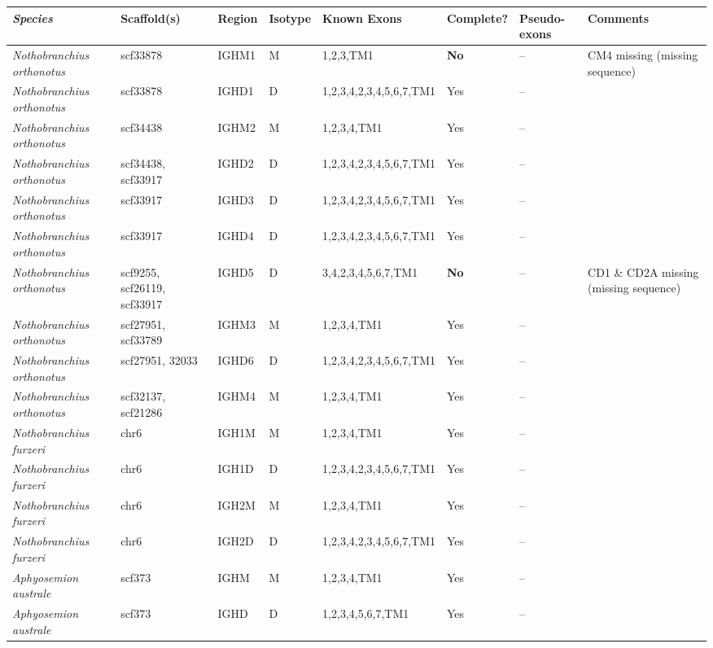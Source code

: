 \begin{tabular}{>{\itshape}lllllllp{4cm}}
  \toprule \textnormal{\textbf{Species}} & \textbf{Scaffold(s)} & \textbf{Region} & \textbf{Isotype} & \textbf{Known Exons} \tnote{1} & \textbf{Complete?} & \textbf{Pseudo-exons} & \textbf{Comments} \\ 
  \midrule Nothobranchius orthonotus & scf33878 & IGHM1 & M & 1,2,3,TM1 & \textbf{No} & -- & CM4 missing (missing sequence) \\ 
  Nothobranchius orthonotus & scf33878 & IGHD1 & D & 1,2,3,4,2,3,4,5,6,7,TM1 & Yes & -- &  \\ 
  Nothobranchius orthonotus & scf34438 & IGHM2 & M & 1,2,3,4,TM1 & Yes & -- &  \\ 
  Nothobranchius orthonotus & scf34438, scf33917 & IGHD2 & D & 1,2,3,4,2,3,4,5,6,7,TM1 & Yes & -- &  \\ 
  Nothobranchius orthonotus & scf33917 & IGHD3 & D & 1,2,3,4,2,3,4,5,6,7,TM1 & Yes & -- &  \\ 
  Nothobranchius orthonotus & scf33917 & IGHD4 & D & 1,2,3,4,2,3,4,5,6,7,TM1 & Yes & -- &  \\ 
  Nothobranchius orthonotus & scf9255, scf26119, scf33917 & IGHD5 & D & 3,4,2,3,4,5,6,7,TM1 & \textbf{No} & -- & CD1 \& CD2A missing (missing sequence) \\ 
  Nothobranchius orthonotus & scf27951, scf33789 & IGHM3 & M & 1,2,3,4,TM1 & Yes & -- &  \\ 
  Nothobranchius orthonotus & scf27951, 32033 & IGHD6 & D & 1,2,3,4,2,3,4,5,6,7,TM1 & Yes & -- &  \\ 
  Nothobranchius orthonotus & scf32137, scf21286 & IGHM4 & M & 1,2,3,4,TM1 & Yes & -- &  \\ 
  Nothobranchius furzeri & chr6 \tnote{2} & IGH1M & M & 1,2,3,4,TM1 & Yes & -- &  \\ 
  Nothobranchius furzeri & chr6 \tnote{2} & IGH1D & D & 1,2,3,4,2,3,4,5,6,7,TM1 & Yes & -- &  \\ 
  Nothobranchius furzeri & chr6 \tnote{2} & IGH2M & M & 1,2,3,4,TM1 & Yes & -- &  \\ 
  Nothobranchius furzeri & chr6 \tnote{2} & IGH2D & D & 1,2,3,4,2,3,4,5,6,7,TM1 & Yes & -- &  \\ 
  Aphyosemion australe & scf373 & IGHM & M & 1,2,3,4,TM1 & Yes & -- &  \\ 
  Aphyosemion australe & scf373 & IGHD & D & 1,2,3,4,5,6,7,TM1 & Yes & -- &  \\ 

\end{tabular}
